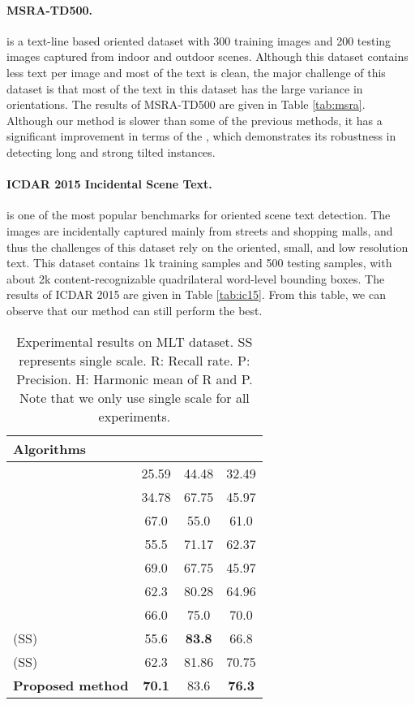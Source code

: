 \documentclass{article}
\begin{document}
\paragraph{MSRA-TD500.} \cite{Yao2012Detecting} is a text-line based oriented dataset with 300 training images and 200 testing images captured from indoor and outdoor scenes. Although this dataset contains less text per image and most of the text is clean, the major challenge of this dataset is that most of the text in this dataset has the large variance in orientations. The results of MSRA-TD500 are given in Table \ref{tab:msra}. Although our method is slower than some of the previous methods, it has a significant improvement in terms of the , which demonstrates its robustness in detecting long and strong tilted instances.

\paragraph{ICDAR 2015 Incidental Scene Text.} \cite{karatzas2015icdar} is one of the most popular benchmarks for oriented scene text detection. The images are incidentally captured mainly from streets and shopping malls, and thus the challenges of this dataset rely on the oriented, small, and low resolution text. This dataset contains 1k training samples and 500 testing samples, with about 2k content-recognizable quadrilateral word-level bounding boxes. The results of ICDAR 2015 are given in Table \ref{tab:ic15}. From this table, we can observe that our method can still perform the best. 

\begin{table}[!t]
\centering
\small
\begin{tabular}{lccc}
  \hline
  Algorithms  &   &  &  \\
  \hline
  \cite{nayef2017icdar2017} & 25.59 & 44.48 & 32.49 \\
  \cite{nayef2017icdar2017} & 34.78 & 67.75 & 45.97 \\
  \cite{ma2018arbitrary} & 67.0 & 55.0 & 61.0 \\
  \cite{ma2018arbitrary} & 55.5 & 71.17 & 62.37 \\
  \cite{nayef2017icdar2017} & 69.0 & 67.75 & 45.97 \\
  \cite{nayef2017icdar2017} & 62.3 & 80.28 & 64.96 \\
  \cite{zhong2018anchor} & 66.0 & 75.0 & 70.0 \\
  \cite{lyu2018multi} (SS) & 55.6 & \bf 83.8 & 66.8 \\
  \cite{liu2018fots} (SS) & 62.3 & 81.86 & 70.75 \\
  \hline
  {\bf Proposed method} & \bf 70.1 & 83.6 & \bf 76.3 \\
  \hline
\end{tabular}
\caption{Experimental results on MLT dataset. SS represents single scale. R: Recall rate. P: Precision. H: Harmonic mean of R and P. Note that we only use single scale for all experiments. }
\label{tab:mlt}
\end{table}
\end{document}
